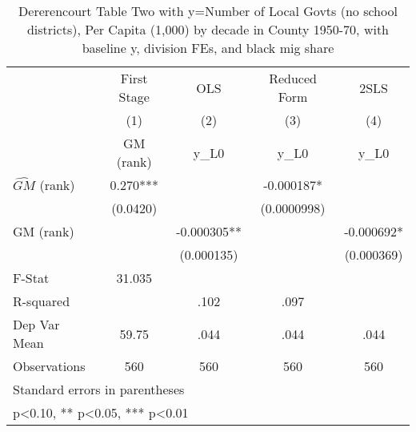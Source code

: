 \begin{table}[htbp]\centering
\def\sym#1{\ifmmode^{#1}\else\(^{#1}\)\fi}
\caption{Dererencourt Table Two with y=Number of Local Govts (no school districts), Per Capita (1,000) by decade in County 1950-70, with baseline y, division FEs, and black mig share}
\begin{tabular}{l*{4}{c}}
\toprule
                    & First Stage   &         OLS   &Reduced Form   &        2SLS   \\
                    &\multicolumn{1}{c}{(1)}&\multicolumn{1}{c}{(2)}&\multicolumn{1}{c}{(3)}&\multicolumn{1}{c}{(4)}\\
                    &\multicolumn{1}{c}{GM  (rank)}&\multicolumn{1}{c}{y\_L0}&\multicolumn{1}{c}{y\_L0}&\multicolumn{1}{c}{y\_L0}\\
\midrule
$\hat{GM}$ (rank)   &       0.270***&               &   -0.000187*  &               \\
                    &    (0.0420)   &               & (0.0000998)   &               \\
\addlinespace
GM  (rank)          &               &   -0.000305** &               &   -0.000692*  \\
                    &               &  (0.000135)   &               &  (0.000369)   \\
\midrule
F-Stat              &      31.035   &               &               &               \\
R-squared           &               &        .102   &        .097   &               \\
Dep Var Mean        &       59.75   &        .044   &        .044   &        .044   \\
Observations        &         560   &         560   &         560   &         560   \\
\bottomrule
\multicolumn{5}{l}{\footnotesize Standard errors in parentheses}\\
\multicolumn{5}{l}{\footnotesize * p<0.10, ** p<0.05, *** p<0.01}\\
\end{tabular}
\end{table}
